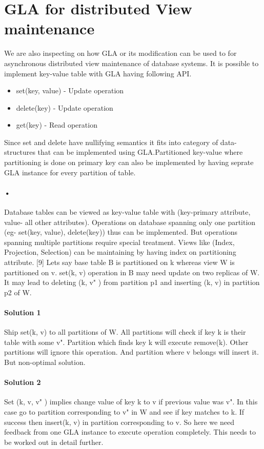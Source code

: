 \documentclass[a4paper,12pt]{report}
\begin{document}
\section{GLA for distributed View maintenance}
We are also inspecting on how GLA or its modification can be used to for asynchronous distributed view maintenance of database systems. It is possible to implement key-value table with GLA having following API.
\begin{itemize}
\item set(key, value) - Update operation
\item delete(key)  - Update operation
\item get(key) - Read operation
\end{itemize}

Since set and delete have nullifying semantics it fits into category of data-structures that can be implemented using GLA.Partitioned key-value where partitioning is done on primary key can also be implemented by having seprate GLA instance for every partition of table.
\paragraph{•}
Database tables can be viewed as  key-value table with (key-primary attribute, value- all other attributes). Operations on database spanning only one partition (eg- set(key, value), delete(key)) thus can be implemented. But operations spanning multiple partitions require special treatment.
Views like (Index, Projection, Selection) can be maintaining by having index on partitioning attribute. [9]
Lets say base table B is partitioned on k whereas view W is partitioned on v.
set(k, v) operation in B may need update on two replicas of W.  It may lead to deleting (k, v" ) from partition p1 and inserting (k, v) in partition p2 of W.
\paragraph{Solution 1}
 Ship set(k, v) to all partitions of W. All partitions will check if key k is their table with some v". Partition which finds key k will execute remove(k). Other partitions will ignore this operation. And partition where v belongs will insert it. But non-optimal solution.
\paragraph{Solution 2}
 Set (k, v, v" ) implies change value of key k to v if previous value was v". In this case go to partition corresponding to v" in W and see if key matches to k. If success then insert(k, v) in partition corresponding to v. So here we need feedback from one GLA instance to execute operation completely. This needs to be worked out in detail further.
 
\end{document}
